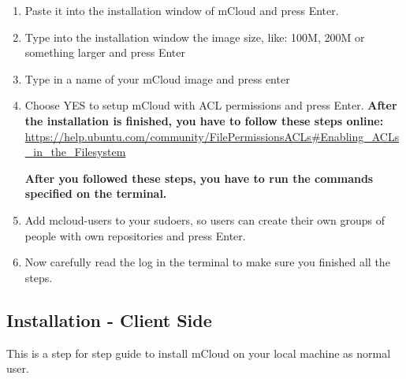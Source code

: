 \documentclass{article}
\begin{document}
\begin{enumerate}
    \item Paste it into the installation window of mCloud and press Enter.
    
    \item Type into the installation window the image size, like: 100M, 200M or something larger and press Enter
    
    \item Type in a name of your mCloud image and press enter
    
    \item Choose YES to setup mCloud with ACL permissions and press Enter. \textbf{After the installation is finished, you have to follow these steps online:}
    \url{https://help.ubuntu.com/community/FilePermissionsACLs#Enabling_ACLs_in_the_Filesystem}
    
    \textbf{After you followed these steps, you have to run the commands specified on the terminal.}
    
    
    \item Add mcloud-users to your sudoers, so users can create their own groups of people with own repositories and press Enter.
    
    \item Now carefully read the log in the terminal to make sure you finished all the steps. 
    
\end{enumerate}


\subsection{Installation - Client Side}
This is a step for step guide to install mCloud on your local machine as normal user.
\end{document}

